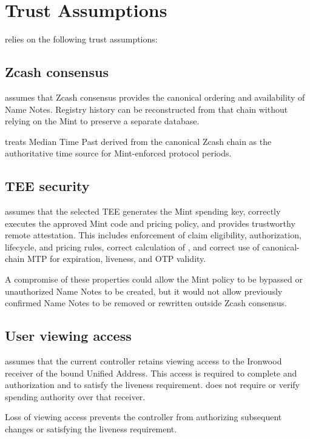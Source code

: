 \section{Trust Assumptions}
\label{sec:trust-assumptions}

\zns{} relies on the following trust assumptions:

\subsection{Zcash consensus}

\zns{} assumes that Zcash consensus provides the canonical ordering and availability of Name Notes. Registry history can be reconstructed from that chain without relying on the Mint to preserve a separate database.

\zns{} treats Median Time Past derived from the canonical Zcash chain as the authoritative time source for Mint-enforced protocol periods.

\subsection{TEE security}

\zns{} assumes that the selected TEE generates the Mint spending key, correctly executes the approved Mint code and pricing policy, and provides trustworthy remote attestation. This includes enforcement of claim eligibility, authorization, lifecycle, and pricing rules, correct calculation of , and correct use of canonical-chain MTP for expiration, liveness, and OTP validity.

A compromise of these properties could allow the Mint policy to be bypassed or unauthorized Name Notes to be created, but it would not allow previously confirmed Name Notes to be removed or rewritten outside Zcash consensus.

\subsection{User viewing access}

\zns{} assumes that the current controller retains viewing access to the Ironwood receiver of the bound Unified Address. This access is required to complete  and  authorization and to satisfy the liveness requirement. \zns{} does not require or verify spending authority over that receiver.

Loss of viewing access prevents the controller from authorizing subsequent changes or satisfying the liveness requirement.


